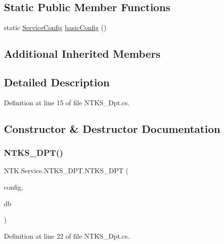 \subsection*{Static Public Member Functions}
\begin{DoxyCompactItemize}
\item 
static \mbox{\hyperlink{struct_n_t_k_1_1_service_1_1_service_config}{Service\+Config}} \mbox{\hyperlink{class_n_t_k_1_1_service_1_1_n_t_k_s___d_p_t_ac63e401d56518d2e0042c79422be7827}{basic\+Config}} ()
\end{DoxyCompactItemize}
\subsection*{Additional Inherited Members}


\subsection{Detailed Description}


Definition at line 15 of file N\+T\+K\+S\+\_\+\+Dpt.\+cs.



\subsection{Constructor \& Destructor Documentation}
\mbox{\label{class_n_t_k_1_1_service_1_1_n_t_k_s___d_p_t_aefe28d6efd35548763e8dfd30fa33623}} 
\subsubsection{\texorpdfstring{NTKS\_DPT()}{NTKS\_DPT()}}
{\footnotesize\ttfamily N\+T\+K.\+Service.\+N\+T\+K\+S\+\_\+\+D\+P\+T.\+N\+T\+K\+S\+\_\+\+D\+PT (\begin{DoxyParamCaption}\item[{\mbox{\hyperlink{struct_n_t_k_1_1_service_1_1_service_config}{Service\+Config}}}]{config,  }\item[{\mbox{\hyperlink{class_n_t_k_1_1_database_1_1_n_t_k_database}{N\+T\+K\+Database}}}]{db }\end{DoxyParamCaption})}



Definition at line 22 of file N\+T\+K\+S\+\_\+\+Dpt.\+cs.



